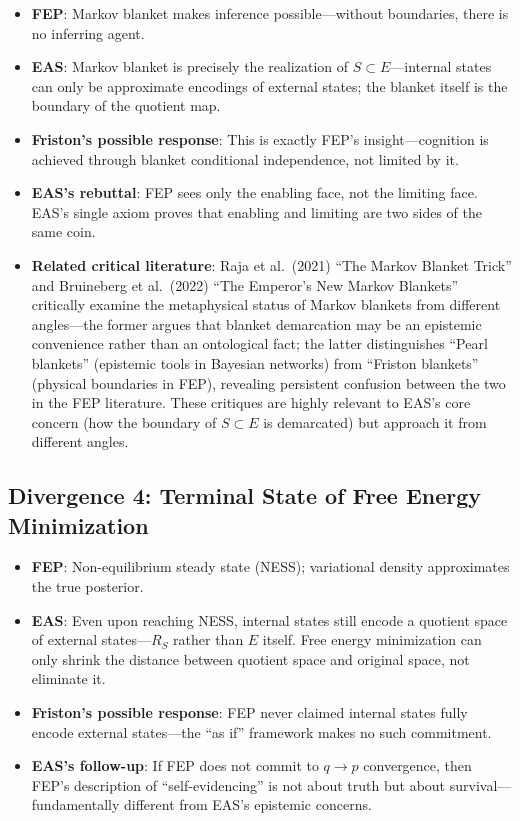 \documentclass[11pt,a4paper]{article}
\begin{document}
\begin{itemize}[leftmargin=*]
\item \textbf{FEP}: Markov blanket makes inference possible---without boundaries, there is no inferring agent.
\item \textbf{EAS}: Markov blanket is precisely the realization of $S \subset E$---internal states can only be approximate encodings of external states; the blanket itself is the boundary of the quotient map.
\item \textbf{Friston's possible response}: This is exactly FEP's insight---cognition is achieved through blanket conditional independence, not limited by it.
\item \textbf{EAS's rebuttal}: FEP sees only the enabling face, not the limiting face. EAS's single axiom proves that enabling and limiting are two sides of the same coin.
\item \textbf{Related critical literature}: Raja et al.\ (2021) ``The Markov Blanket Trick'' and Bruineberg et al.\ (2022) ``The Emperor's New Markov Blankets'' \cite{bruineberg2022} critically examine the metaphysical status of Markov blankets from different angles---the former argues that blanket demarcation may be an epistemic convenience rather than an ontological fact; the latter distinguishes ``Pearl blankets'' (epistemic tools in Bayesian networks) from ``Friston blankets'' (physical boundaries in FEP), revealing persistent confusion between the two in the FEP literature. These critiques are highly relevant to EAS's core concern (how the boundary of $S \subset E$ is demarcated) but approach it from different angles.
\end{itemize}

\subsection{Divergence 4: Terminal State of Free Energy Minimization}

\begin{itemize}[leftmargin=*]
\item \textbf{FEP}: Non-equilibrium steady state (NESS); variational density approximates the true posterior.
\item \textbf{EAS}: Even upon reaching NESS, internal states still encode a quotient space of external states---$R_S$ rather than $E$ itself. Free energy minimization can only shrink the distance between quotient space and original space, not eliminate it.
\item \textbf{Friston's possible response}: FEP never claimed internal states fully encode external states---the ``as if'' framework makes no such commitment.
\item \textbf{EAS's follow-up}: If FEP does not commit to $q \to p$ convergence, then FEP's description of ``self-evidencing'' is not about truth but about survival---fundamentally different from EAS's epistemic concerns.
\end{itemize}
\end{document}
